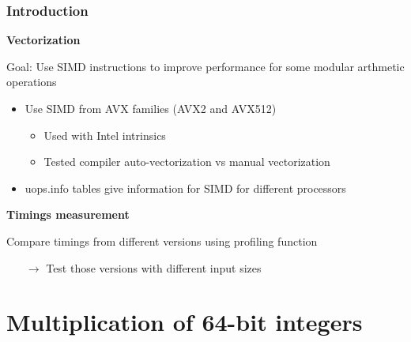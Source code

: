 \documentclass[10pt]{beamer}
\begin{document}
\begin{frame}
\begin{center}
{
        }
    \end{center}
\end{frame}

\begin{frame}
    \frametitle{Introduction}

    \textbf{Vectorization}
    
    Goal: Use SIMD instructions to improve performance for some modular arthmetic operations

    \begin{itemize}
        \item Use SIMD from AVX families (AVX2 and AVX512)
            \begin{itemize}
                \item Used with Intel intrinsics
                \item Tested compiler auto-vectorization vs manual vectorization
            \end{itemize}
        \item uops.info tables give information for SIMD for different processors
    \end{itemize}
    
    \bigskip
    \textbf{Timings measurement}

    Compare timings from different versions using profiling function
    \begin{itemize}
        \item[$\rightarrow$] Test those versions with different input sizes
    \end{itemize}
\end{frame}

\section{Multiplication of 64-bit integers}
\end{document}
